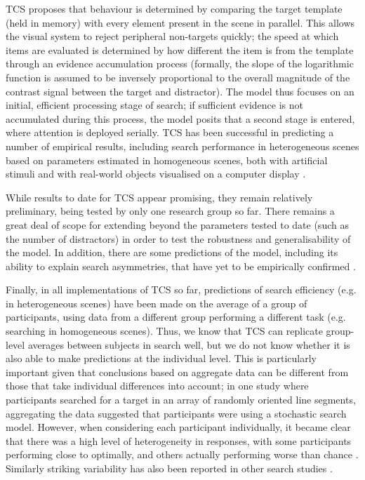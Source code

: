 \documentclass[smallextended]{svjour3}       %
\begin{document}
TCS proposes that behaviour is determined by comparing the target template (held in memory) with every element present in the scene in parallel. This allows the visual system to reject peripheral non-targets quickly; the speed at which items are evaluated is determined by how different the item is from the template through an evidence accumulation process (formally, the slope of the logarithmic function is assumed to be inversely proportional to the overall magnitude of the contrast signal between the target and distractor). The model thus focuses on an initial, efficient processing stage of search; if sufficient evidence is not accumulated during this process, the model posits that a second stage is entered, where attention is deployed serially. TCS has been successful in predicting a number of empirical results, including search performance in heterogeneous scenes based on parameters estimated in homogeneous scenes, both with artificial stimuli \cite{buetti2016towards,lleras2019predicting} and with real-world objects visualised on a computer display \cite{wang2017predicting}. 

While results to date for TCS appear promising, they remain relatively preliminary, being tested by only one research group so far. There remains a great deal of scope for extending beyond the parameters tested to date (such as the number of distractors) in order to test the robustness and generalisability of the model. In addition, there are some predictions of the model, including its ability to explain search asymmetries, that have yet to be empirically confirmed \cite{lleras2020target}.

Finally, in all implementations of TCS so far, predictions of search efficiency (e.g. in heterogeneous scenes) have been made on the average of a group of participants, using data from a different group performing a different task (e.g. searching in homogeneous scenes). Thus, we know that TCS can replicate group-level averages between subjects in search well, but we do not know whether it is also able to make predictions at the individual level. This is particularly important given that conclusions based on aggregate data can be different from those that take individual differences into account; in one study where participants searched for a target in an array of randomly oriented line segments, aggregating the data suggested that participants were using a stochastic search model. However, when considering each participant individually, it became clear that there was a high level of heterogeneity in responses, with some participants performing close to optimally, and others actually performing worse than chance \cite{nowakowska2017human}. Similarly striking variability has also been reported in other search studies \cite{irons2016choosing, irons2018characterizing}. 
\end{document}

